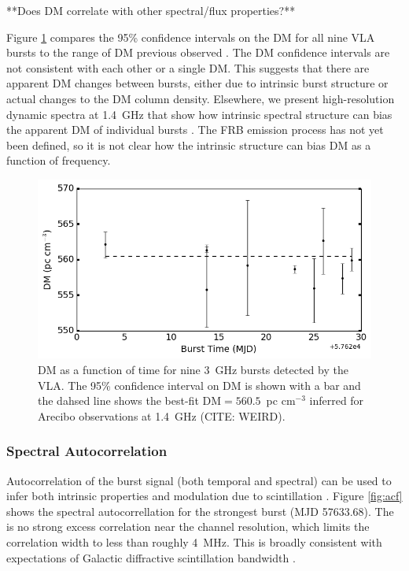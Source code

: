 \documentclass[twocolumn]{aastex61}
\begin{document}
**Does DM correlate with other spectral/flux properties?**

Figure \ref{fig:dmmodel} compares the 95\% confidence intervals on the DM for all nine VLA bursts to the range of DM previous observed \citep{2014ApJ...790..101S,2016arXiv160308880S}. The DM confidence intervals are not consistent with each other or a single DM. This suggests that there are apparent DM changes between bursts, either due to intrinsic burst structure or actual changes to the DM column density. Elsewhere, we present high-resolution dynamic spectra at 1.4~GHz that show how intrinsic spectral structure can bias the apparent DM of individual bursts \citep{WEIRD}. The FRB emission process has not yet been defined, so it is not clear how the intrinsic structure can bias DM as a function of frequency.

\begin{figure}[htb]
\begin{center}
\includegraphics[width=0.9\columnwidth]{dmmodel}
\caption{DM as a function of time for nine 3~GHz bursts detected by the VLA. The 95\% confidence interval on DM is shown with a bar and the dahsed line shows the best-fit DM$=560.5$\ pc cm$^{-3}$ inferred for Arecibo observations at 1.4~GHz (CITE: WEIRD).
\label{fig:dmmodel}}
\end{center}
\end{figure}



\subsubsection{Spectral Autocorrelation}
\label{sec:auto}
Autocorrelation of the burst signal (both temporal and spectral) can be used to infer both intrinsic properties and modulation due to scintillation \citep{CORDES}. Figure \ref{fig:acf} shows the spectral autocorrellation for the strongest burst (MJD 57633.68). The is no strong excess correlation near the channel resolution, which limits the correlation width to less than roughly 4~MHz. This is broadly consistent with expectations of Galactic diffractive scintillation bandwidth \citep[3--9~MHz near 3~GHz][]{2002astro.ph..7156C}.
\end{document}
